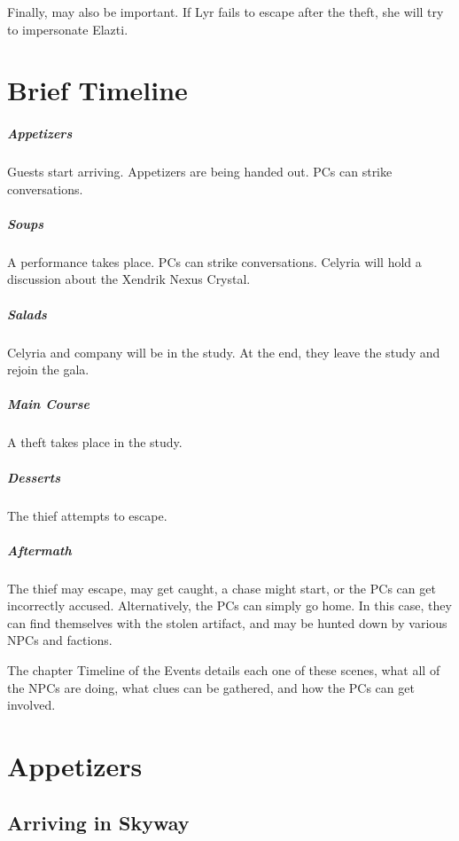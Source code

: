 \documentclass[twocolumn]{dndbook}
\begin{document}
Finally,  may also be important. If Lyr fails to escape after the theft, she will try to impersonate Elazti.

\section{Brief Timeline}


\subparagraph*{Appetizers} Guests start arriving. Appetizers are being handed out. PCs can strike conversations.

\subparagraph*{Soups} A performance takes place. PCs can strike conversations. Celyria will hold a discussion about the Xendrik Nexus Crystal.

\subparagraph*{Salads} Celyria and company will be in the study. At the end, they leave the study and rejoin the gala.

\subparagraph*{Main Course} A theft takes place in the study.

\subparagraph*{Desserts} The thief attempts to escape.

\subparagraph*{Aftermath} The thief may escape, may get caught, a chase might start, or the PCs can get incorrectly accused. Alternatively, the PCs can simply go home. In this case, they can find themselves with the stolen artifact, and may be hunted down by various NPCs and factions.

The chapter Timeline of the Events details each one of these scenes, what all of the NPCs are doing, what clues can be gathered, and how the PCs can get involved.

\section{Appetizers}

\subsection{Arriving in Skyway}
\end{document}
